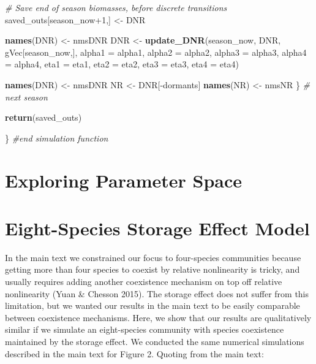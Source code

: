 \documentclass[11pt,]{article}
\newenvironment{Shaded}{\begin{snugshade}}{\end{snugshade}}
\newcommand{\KeywordTok}[1]{\textcolor[rgb]{0.13,0.29,0.53}{\textbf{{#1}}}}
\newcommand{\DataTypeTok}[1]{\textcolor[rgb]{0.13,0.29,0.53}{{#1}}}
\newcommand{\DecValTok}[1]{\textcolor[rgb]{0.00,0.00,0.81}{{#1}}}
\newcommand{\StringTok}[1]{\textcolor[rgb]{0.31,0.60,0.02}{{#1}}}
\newcommand{\CommentTok}[1]{\textcolor[rgb]{0.56,0.35,0.01}{\textit{{#1}}}}
\newcommand{\NormalTok}[1]{{#1}}
\begin{document}
\begin{Shaded}
\begin{Highlighting}[]
    \CommentTok{# Save end of season biomasses, before discrete transitions}
    \NormalTok{saved_outs[season_now}\DecValTok{+1}\NormalTok{,] <-}\StringTok{ }\NormalTok{DNR}
    
    \KeywordTok{names}\NormalTok{(DNR) <-}\StringTok{ }\NormalTok{nmsDNR}
    \NormalTok{DNR        <-}\StringTok{ }\KeywordTok{update_DNR}\NormalTok{(season_now, DNR, gVec[season_now,],}
                             \DataTypeTok{alpha1 =} \NormalTok{alpha1, }\DataTypeTok{alpha2 =} \NormalTok{alpha2, }
                             \DataTypeTok{alpha3 =} \NormalTok{alpha3, }\DataTypeTok{alpha4 =} \NormalTok{alpha4,}
                             \DataTypeTok{eta1 =} \NormalTok{eta1, }\DataTypeTok{eta2 =} \NormalTok{eta2, }\DataTypeTok{eta3 =} \NormalTok{eta3, }\DataTypeTok{eta4 =} \NormalTok{eta4)}
    
    \KeywordTok{names}\NormalTok{(DNR) <-}\StringTok{ }\NormalTok{nmsDNR}
    \NormalTok{NR         <-}\StringTok{ }\NormalTok{DNR[-dormants]  }
    \KeywordTok{names}\NormalTok{(NR)  <-}\StringTok{ }\NormalTok{nmsNR}
  \NormalTok{\} }\CommentTok{# next season}
  
  \KeywordTok{return}\NormalTok{(saved_outs)}
  
\NormalTok{\} }\CommentTok{#end simulation function}
\end{Highlighting}
\end{Shaded}

\section{Exploring Parameter Space}

\section{Eight-Species Storage Effect Model}

In the main text we constrained our focus to four-species communities
because getting more than four species to coexist by relative
nonlinearity is tricky, and usually requires adding another coexistence
mechanism on top off relative nonlinearity (Yuan \& Chesson 2015). The
storage effect does not suffer from this limitation, but we wanted our
results in the main text to be easily comparable between coexistence
mechanisms. Here, we show that our results are qualitatively similar if
we simulate an eight-species community with species coexistence
maintained by the storage effect. We conducted the same numerical
simulations described in the main text for Figure 2. Quoting from the
main text:
\end{document}
